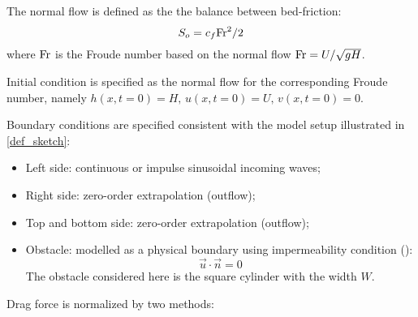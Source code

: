 \documentclass{jfm}
\newcommand{\fr}{{\rm{Fr}}}
\begin{document}
The normal flow is defined as the the balance between bed-friction:
\begin{equation}
	S_o = {c_f} \fr^2 / {2}
	\label{normalFlow}
\end{equation}
where $\fr$ is the Froude number based on the normal flow $\fr=U/\sqrt{gH}$.


Initial condition is specified as the normal flow for the corresponding Froude number, namely $h(x, t=0)=H,\, u(x, t=0)=U,\, v(x, t=0)=0$.

Boundary conditions are specified consistent with the model setup illustrated in \autoref{def_sketch}:
\begin{itemize}
	\item Left side: continuous or impulse sinusoidal incoming waves;
	\item Right side: zero-order extrapolation (outflow);
	\item Top and bottom side: zero-order extrapolation (outflow);
	\item Obstacle: modelled as a physical boundary using impermeability condition (\cite{Hervouet2007}):
	\begin{equation}
		\vec{u} \cdot \vec{n}=0
		\label{obstacleBC}
	\end{equation}
The obstacle considered here is the square cylinder with the width $W$.
\end{itemize}

Drag force is normalized by two methods:
\end{document}
